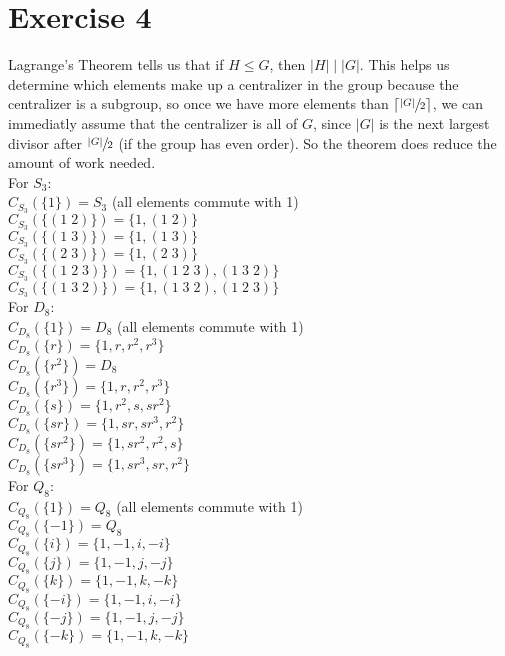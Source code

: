 \documentclass{article}
\begin{document}
    \section*{Exercise 4}
    Lagrange's Theorem tells us that if $H \leqslant G$,
    then $|H| \mid |G|$.
    This helps us determine which elements make up a centralizer in
    the group because the centralizer is a subgroup,
    so once we have more elements than $\lceil \sfrac{|G|}{2} \rceil$,
    we can immediatly assume that the centralizer is all of $G$,
    since $|G|$ is the next largest divisor after $\sfrac{|G|}{2}$ 
    (if the group has even order).
    So the theorem does reduce the amount of work needed. \\
    For $S_3$: \\
    $C_{S_3}(\{ 1 \}) = S_3$ (all elements commute with 1) \\
    $C_{S_3}(\{(1\;2)\}) = \{1, (1\;2)\}$ \\
    $C_{S_3}(\{(1\;3)\}) = \{1, (1\;3)\}$ \\
    $C_{S_3}(\{(2\;3)\}) = \{1, (2\;3)\}$ \\
    $C_{S_3}(\{(1\;2\;3)\}) = \{1, (1\;2\;3), (1\;3\;2)\}$ \\
    $C_{S_3}(\{(1\;3\;2)\}) = \{1, (1\;3\;2), (1\;2\;3)\}$ \\
    For $D_8$: \\
    $C_{D_8}(\{ 1 \}) = D_8$ (all elements commute with 1) \\
    $C_{D_8}(\{ r \}) = \{1, r, r^2, r^3\}$ \\
    $C_{D_8}(\{ r^2 \}) = D_8$ \\
    $C_{D_8}(\{ r^3 \}) = \{1, r, r^2, r^3\}$ \\
    $C_{D_8}(\{ s \}) = \{1, r^2, s, sr^2\}$ \\
    $C_{D_8}(\{ sr \}) = \{1, sr, sr^3, r^2\}$ \\
    $C_{D_8}(\{ sr^2 \}) = \{1, sr^2, r^2, s\}$ \\
    $C_{D_8}(\{ sr^3 \}) = \{1, sr^3, sr, r^2\}$ \\
    For $Q_8$: \\
    $C_{Q_8}(\{ 1 \}) = Q_8$ (all elements commute with 1) \\
    $C_{Q_8}(\{ -1 \}) = Q_8$ \\
    $C_{Q_8}(\{ i \}) = \{ 1, -1, i, -i \}$ \\
    $C_{Q_8}(\{ j \}) = \{ 1, -1, j, -j \}$ \\
    $C_{Q_8}(\{ k \}) = \{ 1, -1, k, -k \}$ \\
    $C_{Q_8}(\{ -i \}) = \{ 1, -1, i, -i \}$ \\
    $C_{Q_8}(\{ -j \}) = \{ 1, -1, j, -j \}$ \\
    $C_{Q_8}(\{ -k \}) = \{ 1, -1, k, -k \}$
\end{document}
